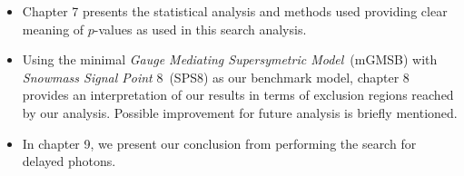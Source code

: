 \begin{itemize}
\item Chapter 7 presents the statistical analysis and methods used providing clear meaning of $p$-values as used in this search analysis.

\item Using the minimal \textit{Gauge Mediating Supersymetric Model}~(mGMSB) with \textit{Snowmass Signal Point} 8~(SPS8) as our benchmark model, chapter 8 provides an interpretation of our results in terms of exclusion regions reached by our analysis. Possible improvement for future analysis is briefly mentioned. 

\item  In chapter 9, we present our conclusion from performing the search for delayed photons.

\end{itemize}






